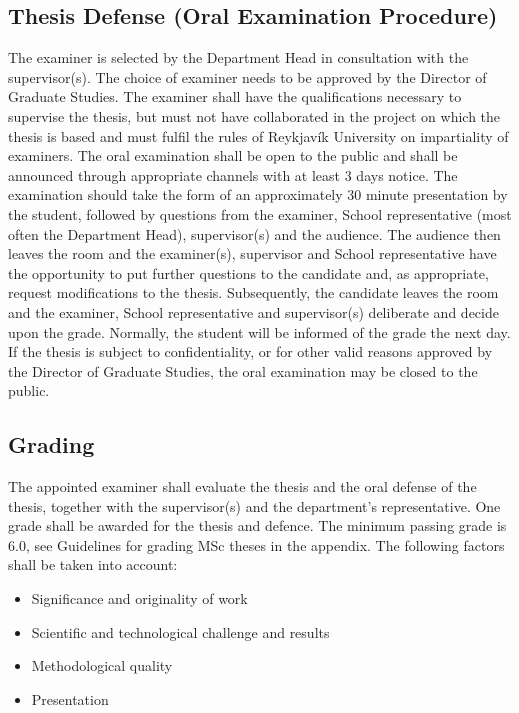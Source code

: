 \subsection{Thesis Defense (Oral Examination Procedure)}
The examiner is selected by the Department Head in consultation with the supervisor(s).  
The choice of examiner needs to be approved by the Director of Graduate Studies.  
The examiner shall have the qualifications necessary to supervise the thesis, but must not have collaborated in the project on which the thesis is based and must fulfil the rules of Reykjavík University on impartiality of examiners.
The oral examination shall be open to the public and shall be announced through appropriate channels with at least 3 days notice.  
The examination should take the form of an approximately 30 minute presentation by the student, followed by questions from the examiner, School representative (most often the Department Head), supervisor(s) and the audience.  
The audience then leaves the room and the examiner(s), supervisor and School representative have the opportunity to put further questions to the candidate and, as appropriate, request modifications to the thesis.  
Subsequently, the candidate leaves the room and the examiner, School representative and supervisor(s) deliberate and decide upon the grade.  
Normally, the student will be informed of the grade the next day.  
If the thesis is subject to confidentiality, or for other valid reasons approved by the Director of Graduate Studies, the oral examination may be closed to the public.
\subsection{Grading}
The appointed examiner shall evaluate the thesis and the oral defense of the thesis, together with the
supervisor(s) and the department's representative.  
One grade shall be awarded for the thesis and defence.  
The minimum passing grade is 6.0, see Guidelines for grading MSc theses in the appendix.  
The following factors shall be taken into account:

\begin{itemize}
\item Significance and originality of work
\item Scientific and technological challenge and results
\item Methodological quality
\item Presentation
\end{itemize}

